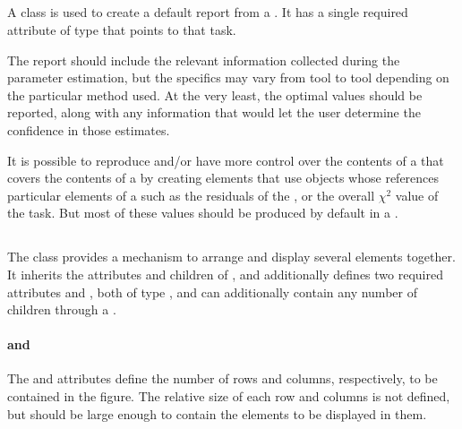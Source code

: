 \begin{blockChanged}
\subsection{}
\label{class:parameterEstimationReport}
A \ParameterEstimationReport class is used to create a default report from a \ParameterEstimationTask.  It has a single required attribute  of type \SIdRef that points to that task.


The report should include the relevant information collected during the parameter estimation, but the specifics may vary from tool to tool depending on the particular method used.  At the very least, the optimal \AdjustableParameter values should be reported, along with any information that would let the user determine the confidence in those estimates.

It is possible to reproduce and/or have more control over the contents of a \Report that covers the contents of a \ParameterEstimationTask by creating \DataGenerator elements that use \DependentVariable objects whose  references particular elements of a \ParameterEstimationTask such as the residuals of the \Objective, or the overall $\chi^2$ value of the task.  But most of these values should be produced by default in a \ParameterEstimationReport.


\subsection{}
\label{class:figure}
\label{class:listOfSubPlots}

The \Figure class provides a mechanism to arrange and display several \Plot elements together.  It inherits the attributes and children of \Output, and additionally defines two required attributes  and , both of type , and can additionally contain any number of \SubPlot children through a \ListOfSubPlots.


\paragraph*{ and }
The  and  attributes define the number of rows and columns, respectively, to be contained in the figure.  The relative size of each row and columns is not defined, but should be large enough to contain the \Plot elements to be displayed in them.


\end{blockChanged}
